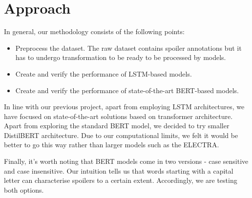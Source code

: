 \documentclass[11pt]{article}
\begin{document}
\section{Approach} \label{approach}

In general, our methodology consists of the following points:
\begin{itemize}
\item Preprocess the dataset. The raw dataset contains spoiler annotations but it has to undergo transformation to be ready to be processed by models.
\item Create and verify the performance of LSTM-based models.
\item Create and verify the performance of state-of-the-art BERT-based models.
\end{itemize}

In line with our previous project, apart from employing LSTM architectures, we have focused on state-of-the-art solutions based on transformer architecture. Apart from exploring the standard BERT model, we decided to try smaller DistilBERT architecture. Due to our computational limits, we felt it would be better to go this way rather than larger models such as the ELECTRA. 

Finally, it's worth noting that BERT models come in two versions - case sensitive and case insensitive. Our intuition tells us that words starting with a capital letter can characterise spoilers to a certain extent. Accordingly, we are testing both options.

\end{document}
